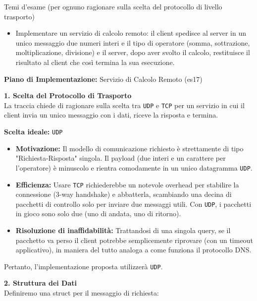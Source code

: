 \documentclass[11pt]{article}
\begin{document}
\begin{tcolorbox}[colback=blue!5!white,colframe=blue!75!black,title=\textbf{DOMANDA}, breakable]
Temi d'esame (per ognuno ragionare sulla scelta del protocollo di livello trasporto)
\begin{itemize}
    \item Implementare un servizio di calcolo remoto: il client spedisce al server in un unico messaggio due numeri interi e il tipo di operatore (somma, sottrazione, moltiplicazione, divisione) e il server, dopo aver svolto il calcolo, restituisce il risultato al client che così termina la sua esecuzione.
\end{itemize}
\end{tcolorbox}

\begin{tcolorbox}[colback=green!5!white,colframe=green!75!black,title=\textbf{RISPOSTA}, breakable]
\textbf{Piano di Implementazione:} Servizio di Calcolo Remoto (es17)

\textbf{1. Scelta del Protocollo di Trasporto}\\
La traccia chiede di ragionare sulla scelta tra \texttt{UDP} e \texttt{TCP} per un servizio in cui il client invia un unico messaggio con i dati, riceve la risposta e termina.

\textbf{Scelta ideale:} \texttt{UDP}

\begin{itemize}
    \item \textbf{Motivazione:} Il modello di comunicazione richiesto è strettamente di tipo "Richiesta-Risposta" singola. Il payload (due interi e un carattere per l'operatore) è minuscolo e rientra comodamente in un unico datagramma \texttt{UDP}.
    \item \textbf{Efficienza:} Usare \texttt{TCP} richiederebbe un notevole overhead per stabilire la connessione (3-way handshake) e abbatterla, scambiando una decina di pacchetti di controllo solo per inviare due messaggi utili. Con \texttt{UDP}, i pacchetti in gioco sono solo due (uno di andata, uno di ritorno).
    \item \textbf{Risoluzione di inaffidabilità:} Trattandosi di una singola query, se il pacchetto va perso il client potrebbe semplicemente riprovare (con un timeout applicativo), in maniera del tutto analoga a come funziona il protocollo DNS.
\end{itemize}
Pertanto, l'implementazione proposta utilizzerà \texttt{UDP}.

\textbf{2. Struttura dei Dati}\\
Definiremo una struct per il messaggio di richiesta:


\end{tcolorbox}
\end{document}
